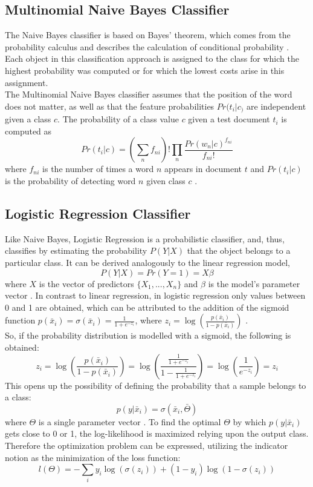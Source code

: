 \documentclass[a4paper, 11pt,titlepage,oneside,openany]{book}
\begin{document}
\subsection{Multinomial Naive Bayes Classifier}
The Naive Bayes classifier is based on  Bayes' theorem, which comes from the probability calculus and describes the calculation of conditional probability \cite{btheory}. Each object in this classification approach is assigned to the class for which the highest probability was computed or for which the lowest costs arise in this assignment.  \\
\noindent The Multinomial Naive Bayes classifier assumes that the position of the word does not matter, as well as  that the feature probabilities $Pr(t_i|c_)$ are independent given a class $c$.
The probability of a class value $c$ given a test document $t_i$ is computed as
\[
Pr(t_i|c)=(\sum_{n}f_{ni})!\prod_{n}\frac{Pr(w_n|c)^{f_{ni}}}{f_{ni}!}
\]
where $f_{ni}$ is the number of times a word $n$ appears in document $t$ and $Pr(t_i|c)$ is the probability of detecting word $n$ given class $c$ \cite{multinomialnb}.
\newpage
\subsection{Logistic Regression Classifier}
\noindent Like Naive Bayes, Logistic Regression is a probabilistic classifier, and, thus, classifies by estimating the probability $P(Y|X)$ that the object belongs to a particular class.
It can be derived analogously to the linear regression model, 
\[
P(Y|X)=Pr(Y=1)=X\beta
\]
where $X$ is the vector of predictors $\{X_1,...,X_n\}$ and $\beta$ is the model's parameter vector \cite{logisticregressionbook}. In contrast to linear regression, in logistic regression only values between 0 and 1 are obtained, which can be attributed to the addition of the sigmoid function $p(\bar{x}_i)=\sigma(\bar{x}_i)=\frac{1}{1+e^{-z_i}}$, where $z_i=\log(\frac{p(\bar{x}_i)}{1-p(\bar{x}_i)})$ \cite{algorithms2}. \\
So, if the probability distribution is modelled with a sigmoid, the following is obtained:
\[
z_i=\log(\frac{p(\bar{x}_i)}{1-p(\bar{x}_i)})=\log(\frac{\frac{1}{1+e^{-z_i}}}{1-\frac{1}{1+e^{-z_i}}})=\log(\frac{1}{e^{-z_i}})=z_i
\]
This opens up the possibility of defining the probability that a sample belongs to a class:
\[
p(y|\bar{x}_i)=\sigma(\bar{x}_i,\bar{\Theta})
\]
where $\Theta$ is a single parameter vector \cite{algorithms2}.
\noindent To find the optimal $\Theta$ by which $p(y|\bar{x}_i)$ gets close to 0 or 1, the log-likelihood is maximized relying upon the output class. Therefore the optimization problem can be expressed, utilizing the indicator notion as the minimization of the loss function:
\[
l(\Theta)=-\sum_{i}y_i\log(\sigma(z_i))+(1-y_i)\log(1-\sigma(z_i))
\]
\end{document}
